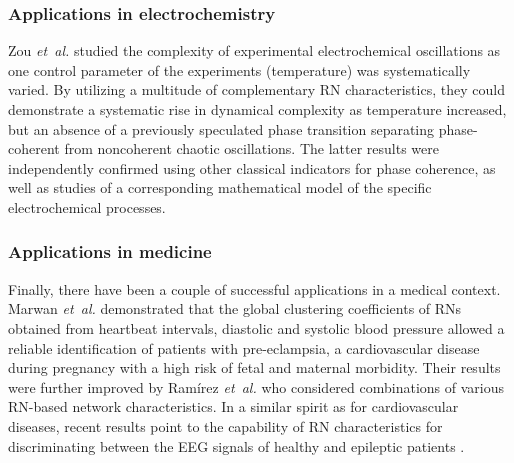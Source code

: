 \subsubsection{Applications in electrochemistry}

Zou \textit{et~al.} \cite{Zou2012bChaos} studied the complexity of experimental electrochemical oscillations as one control parameter of the experiments (temperature) was systematically varied. By utilizing a multitude of complementary RN characteristics, they could demonstrate a systematic rise in dynamical complexity as temperature increased, but an absence of a previously speculated phase transition \cite{wickramasinghe_chaos_2010} separating phase-coherent from noncoherent chaotic oscillations. The latter results were independently confirmed using other classical indicators for phase coherence, as well as studies of a corresponding mathematical model of the specific electrochemical processes.


\subsubsection{Applications in medicine}

Finally, there have been a couple of successful applications in a medical context. Marwan \textit{et~al.} \cite{Marwan2010Biosignal} demonstrated that the global clustering coefficients of RNs obtained from heartbeat intervals, diastolic and systolic blood pressure allowed a reliable identification of patients with pre-eclampsia, a cardiovascular disease during pregnancy with a high risk of fetal and maternal morbidity. Their results were further improved by Ram\'{i}rez \textit{et~al.} \cite{Ramirez2012,Ramirez2013} who considered combinations of various RN-based network characteristics. In a similar spirit as for cardiovascular diseases, recent results point to the capability of RN characteristics for discriminating between the EEG signals of healthy and epileptic patients \cite{Subramaniyam2013}.







